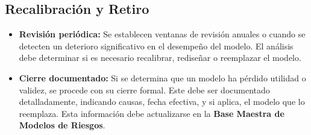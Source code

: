 \documentclass[11pt,oneside]{article}%
\begin{document}
\subsection{Recalibración y Retiro}
\begin{itemize}
\item \textbf{Revisión periódica:} Se establecen ventanas de revisión anuales  o cuando se detecten un deterioro significativo en el desempeño del modelo. El análisis debe determinar si es necesario  recalibrar, rediseñar o reemplazar el modelo. 
\item \textbf{Cierre documentado:} Si se determina que un modelo ha pérdido utilidad o validez, se procede con su cierre formal. Este debe ser documentado detalladamente, indicando causas, fecha efectiva, y si aplica, el modelo que lo reemplaza. Esta información debe actualizarse en la \textbf{Base Maestra de Modelos de Riesgos}. 
\end{itemize}


\end{document}

